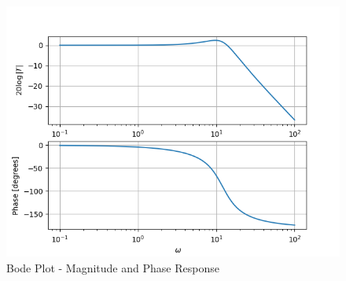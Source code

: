 \documentclass[journal,12pt,twocolumn]{IEEEtran}
\theoremstyle{remark}
\begin{document}
\begin{figure}[h]
    \centering  

\includegraphics[width=\columnwidth]{2021/EE/46/figs/plot.png}

    \centering
    \caption{Bode Plot - Magnitude and Phase Response}

    \label{fig:ee2.46.2021}
\end{figure}
\end{document}
